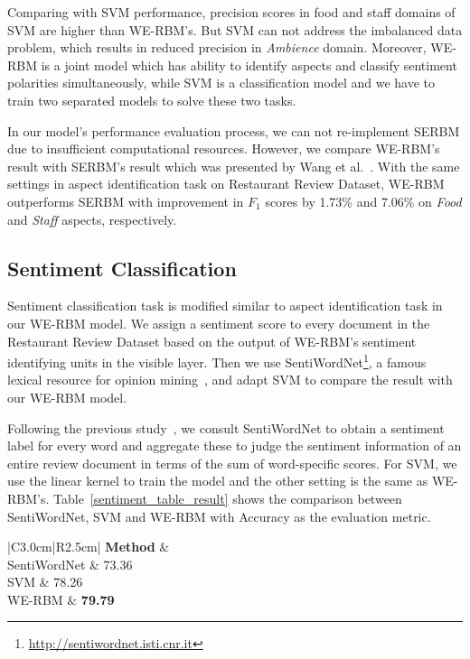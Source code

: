 Comparing with SVM performance, precision scores in food and staff domains of SVM are higher than WE-RBM's.
But SVM can not address the imbalanced data problem, which results in reduced precision in \textit{Ambience} domain.
Moreover, WE-RBM is a joint model which has ability to identify aspects and classify sentiment polarities simultaneously, while SVM is a classification model and we have to train two separated models to solve these two tasks.

In our model's performance evaluation process, we can not re-implement SERBM due to insufficient computational resources.
However, we compare WE-RBM's result with SERBM's result which was presented by Wang et al.~\cite{serbm}.
With the same settings in aspect identification task on Restaurant Review Dataset, WE-RBM outperforms SERBM with improvement in $F_1$ scores by 1.73\% and 7.06\% on \textit{Food} and \textit{Staff} aspects, respectively.

\subsection{Sentiment Classification}

Sentiment classification task is modified similar to aspect identification task in our WE-RBM model.
We assign a sentiment score to every document in the Restaurant Review Dataset based on the output of WE-RBM's sentiment identifying units in the visible layer.
Then we use SentiWordNet\footnote{\url{http://sentiwordnet.isti.cnr.it}}, a famous lexical resource for opinion mining~\cite{senti_wordnet}, and adapt SVM to compare the result with our WE-RBM model.

Following the previous study~\cite{serbm}, we consult SentiWordNet to obtain a sentiment label for every word and aggregate these to judge the sentiment information of an entire review document in terms of the sum of word-specific scores.
For SVM, we use the linear kernel to train the model and the other setting is the same as WE-RBM's.
Table~\ref{sentiment_table_result} shows the comparison between SentiWordNet, SVM and WE-RBM with Accuracy as the evaluation metric.

\begin{table}[h]
	\centering
	\caption{Accuracy of SentiWordNet, SVM and WE-RBM on sentiment classification task}
	\begin{tabular}{|C{3.0cm}|R{2.5cm}|}
		\hline
		\textbf{Method}   & 
		\\
		\hline
		SentiWordNet & 73.36        
		\\ 
		\hline
		SVM & 78.26
		\\ 
		\hline
		WE-RBM & \textbf{79.79}
		\\
		\hline
	\end{tabular}
	\label{sentiment_table_result}
\end{table}

